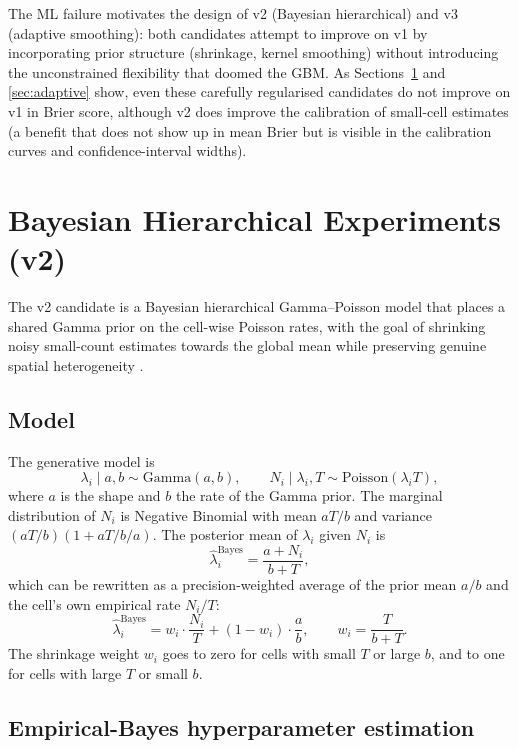 \documentclass[10pt,a4paper,twocolumn]{article}
\begin{document}
The ML failure motivates the design of v2 (Bayesian hierarchical) and v3 (adaptive smoothing): both candidates attempt to improve on v1 by incorporating prior structure (shrinkage, kernel smoothing) without introducing the unconstrained flexibility that doomed the GBM. As Sections~\ref{sec:bayesian} and \ref{sec:adaptive} show, even these carefully regularised candidates do not improve on v1 in Brier score, although v2 does improve the calibration of small-cell estimates (a benefit that does not show up in mean Brier but is visible in the calibration curves and confidence-interval widths).

\section{Bayesian Hierarchical Experiments (v2)}\label{sec:bayesian}

The v2 candidate is a Bayesian hierarchical Gamma--Poisson model that places a shared Gamma prior on the cell-wise Poisson rates, with the goal of shrinking noisy small-count estimates towards the global mean while preserving genuine spatial heterogeneity \cite{clayton1987}.

\subsection{Model}

The generative model is
\[
\lambda_i \mid a, b \sim \text{Gamma}(a, b), \qquad N_i \mid \lambda_i, T \sim \text{Poisson}(\lambda_i T),
\]
where $a$ is the shape and $b$ the rate of the Gamma prior. The marginal distribution of $N_i$ is Negative Binomial with mean $aT/b$ and variance $(aT/b)(1 + aT/b/a)$. The posterior mean of $\lambda_i$ given $N_i$ is
\[
\hat\lambda_i^{\text{Bayes}} = \frac{a + N_i}{b + T},
\]
which can be rewritten as a precision-weighted average of the prior mean $a/b$ and the cell's own empirical rate $N_i/T$:
\[
\hat\lambda_i^{\text{Bayes}} = w_i \cdot \frac{N_i}{T} + (1-w_i) \cdot \frac{a}{b}, \qquad w_i = \frac{T}{b + T}.
\]
The shrinkage weight $w_i$ goes to zero for cells with small $T$ or large $b$, and to one for cells with large $T$ or small $b$.

\subsection{Empirical-Bayes hyperparameter estimation}
\end{document}
